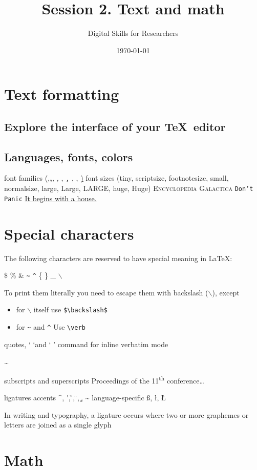 \documentclass[a4paper,11pt]{article}
\title{Session 2. Text and math}
\author{Digital Skills for Researchers}
\date{\today}
\begin{document}
\maketitle
\tableofcontents

\section{Text formatting}

\subsection{Explore the interface of your \TeX~editor}

\subsection{Languages, fonts, colors}

font families (\textrm,\textbf,\textit, \textsl, \textsc, \texttt, \textsf, \textnormal, \underline)
font sizes (tiny, scriptsize, footnotesize, small, normalsize, large, Large, LARGE, huge, Huge)
\textsc{Encyclopedia Galactica}
\texttt{Don't Panic} 
\underline{It begins with a house.}

\section{Special characters}
The following characters are reserved to have special meaning in \LaTeX:

\$ \% \& \verb|~| \verb|^| \{ \} \_ $\backslash$ 

To print them literally you need to escape them with backslash ($\backslash$), except
\begin{itemize}
	\item for $\backslash$ itself use \verb|$\backslash$|
	\item for \verb|~| and \verb|^| Use \verb|\verb| 
\end{itemize}
 
quotes, ` \lq and ‘ \rq 
\verb|| command for inline verbatim mode

\ldots

subscripts and superscripts
Proceedings of the 11\textsuperscript{th} conference\ldots

ligatures
accents \^{}, \'{}, \v{}, \"{}, \c{}, \~{}
language-specific \ss{}, \l{}, \L{}

In writing and typography, a ligature occurs where two or more graphemes or letters are joined as a single glyph




\section{Math}
\end{document}
